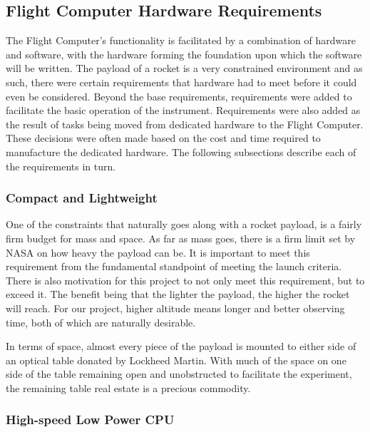 \documentclass[11pt,titlepage]{article}
\begin{document}
\subsection{Flight Computer Hardware Requirements}

The Flight Computer's functionality is facilitated by a combination of hardware and software, with the hardware forming the foundation upon which
the software will be written. The payload of a rocket is a very constrained environment and as such, there were certain requirements that hardware 
had to meet before it could even be considered. Beyond the base requirements, requirements were added to facilitate the basic operation of the instrument.
Requirements were also added as the result of tasks being moved from dedicated hardware to the Flight Computer. These decisions were often made based on
the cost and time required to manufacture the dedicated hardware. The following subsections describe each of the requirements in turn.

\subsubsection{Compact and Lightweight}

One of the constraints that naturally goes along with a rocket payload, is a fairly firm budget for mass and space. As far as
mass goes, there is a firm limit set by NASA on how heavy the payload can be. It is important to meet this requirement from the fundamental
standpoint of meeting the launch criteria. There is also motivation for this project to not only meet this requirement, but to exceed it. The
benefit being that the lighter the payload, the higher the rocket will reach. For our project, higher altitude means longer and better observing
time, both of which are naturally desirable.

In terms of space, almost every piece of the payload is mounted to either side of an optical table donated by Lockheed Martin. With much of the
space on one side of the table remaining open and unobstructed to facilitate the experiment, the remaining table real estate is a precious commodity.

\subsubsection{High-speed Low Power CPU}
\end{document}
